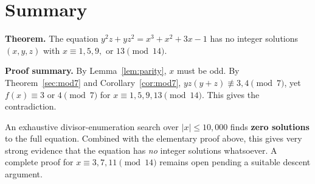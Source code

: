 \documentclass[12pt, a4paper]{article}
\theoremstyle{definition}
\begin{document}
\section{Summary}

\begin{tcolorbox}[mythm, title={Main Result (partial proof)}]
\textbf{Theorem.}
The equation $y^2z + yz^2 = x^3 + x^2 + 3x - 1$ has no integer solutions
$(x,y,z)$ with $x \equiv 1, 5, 9,$ or $13\pmod{14}$.
\medskip

\noindent\textbf{Proof summary.}
By Lemma~\ref{lem:parity}, $x$ must be odd.
By Theorem~\ref{sec:mod7} and Corollary~\ref{cor:mod7},
$yz(y+z)\not\equiv 3, 4\pmod7$, yet $f(x)\equiv3$ or $4\pmod7$ for
$x\equiv1,5,9,13\pmod{14}$.  This gives the contradiction.
\end{tcolorbox}

\begin{tcolorbox}[myobs, title={Computational Evidence}]
An exhaustive divisor-enumeration search over $|x|\le 10{,}000$ finds
\textbf{zero solutions} to the full equation.  Combined with the
elementary proof above, this gives very strong evidence that the
equation has \emph{no} integer solutions whatsoever.  A complete proof
for $x\equiv3,7,11\pmod{14}$ remains open pending a suitable
descent argument.
\end{tcolorbox}
\end{document}
